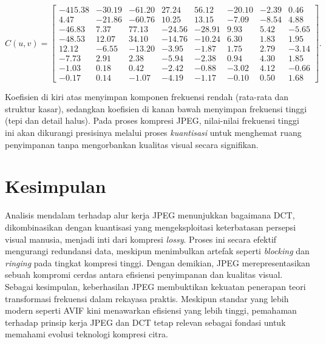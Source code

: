 \documentclass[a4paper]{article}
\begin{document}
\[
  C(u,v) =
  \begin{bmatrix}
    -415.38 & -30.19 & -61.20 & 27.24  & 56.12  & -20.10 & -2.39 & 0.46  \\
    4.47    & -21.86 & -60.76 & 10.25  & 13.15  & -7.09  & -8.54 & 4.88  \\
    -46.83  & 7.37   & 77.13  & -24.56 & -28.91 & 9.93   & 5.42  & -5.65 \\
    -48.53  & 12.07  & 34.10  & -14.76 & -10.24 & 6.30   & 1.83  & 1.95  \\
    12.12   & -6.55  & -13.20 & -3.95  & -1.87  & 1.75   & 2.79  & -3.14 \\
    -7.73   & 2.91   & 2.38   & -5.94  & -2.38  & 0.94   & 4.30  & 1.85  \\
    -1.03   & 0.18   & 0.42   & -2.42  & -0.88  & -3.02  & 4.12  & -0.66 \\
    -0.17   & 0.14   & -1.07  & -4.19  & -1.17  & -0.10  & 0.50  & 1.68
  \end{bmatrix}.
\]

Koefisien di kiri atas menyimpan komponen frekuensi rendah (rata-rata dan struktur kasar), sedangkan koefisien di kanan bawah menyimpan frekuensi tinggi (tepi dan detail halus). Pada proses kompresi JPEG, nilai-nilai frekuensi tinggi ini akan dikurangi presisinya melalui proses \textit{kuantisasi} untuk menghemat ruang penyimpanan tanpa mengorbankan kualitas visual secara signifikan.


\section{Kesimpulan}
Analisis mendalam terhadap alur kerja JPEG menunjukkan bagaimana DCT, dikombinasikan dengan kuantisasi yang mengeksploitasi keterbatasan persepsi visual manusia, menjadi inti dari kompresi \textit{lossy}. Proses ini secara efektif mengurangi redundansi data, meskipun menimbulkan artefak seperti \textit{blocking} dan \textit{ringing} pada tingkat kompresi tinggi. Dengan demikian, JPEG merepresentasikan sebuah kompromi cerdas antara efisiensi penyimpanan dan kualitas visual.
Sebagai kesimpulan, keberhasilan JPEG membuktikan kekuatan penerapan teori transformasi frekuensi dalam rekayasa praktis. Meskipun standar yang lebih modern seperti AVIF kini menawarkan efisiensi yang lebih tinggi, pemahaman terhadap prinsip kerja JPEG dan DCT tetap relevan sebagai fondasi untuk memahami evolusi teknologi kompresi citra.


\printbibliography
\end{document}
